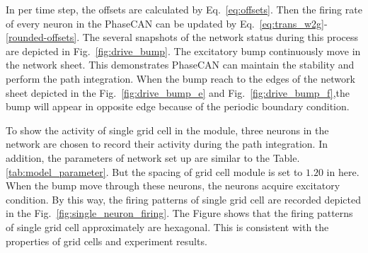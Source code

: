 \documentclass[final,5p,times,twocolumn,authoryear]{elsarticle}
\begin{document}
In per time step, the offsets are calculated by Eq.~\eqref{eq:offsets}. Then the firing rate of every neuron in the PhaseCAN can be updated by Eq.~\eqref{eq:trans_w2g}-\eqref{rounded-offsets}. The several snapshots of the network status during this process are depicted in Fig.~\ref{fig:drive_bump}. The excitatory bump continuously move in the network sheet. This demonstrates PhaseCAN can maintain the stability and perform the path integration. When the bump reach to the edges of the network sheet depicted in the Fig.~\ref{fig:drive_bump_e} and Fig.~\ref{fig:drive_bump_f},the bump will appear in opposite edge because of the periodic boundary condition.

To show the activity of single grid cell in the module, three neurons in the network are chosen to record their activity during the path integration. In addition, the parameters of network set up are similar to the  Table.\ref{tab:model_parameter}. But the spacing of grid cell module is set to $1.20$ in here. When the bump move through these neurons, the neurons acquire excitatory condition. By this way, the firing patterns of single grid cell are recorded depicted in the Fig.~\ref{fig:single_neuron_firing}. The Figure shows that the firing patterns of single grid cell approximately are hexagonal. This is consistent with the properties of grid cells and experiment results\citep{Hafting2005}.
\end{document}
